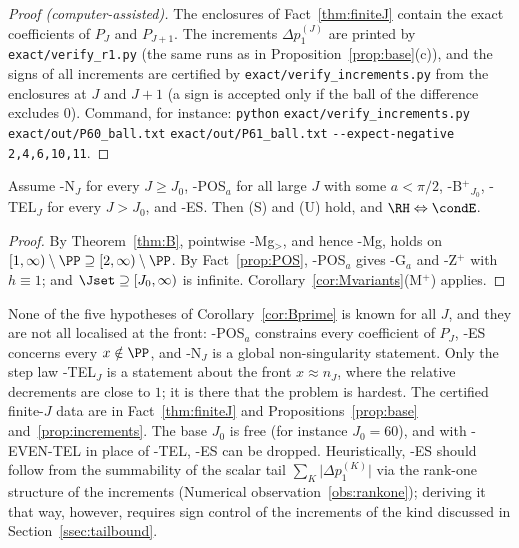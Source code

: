 \begin{proof}[Proof \textup{(computer-assisted)}]
The enclosures of Fact~\ref{thm:finiteJ} contain the exact coefficients of $P_J$ and $P_{J+1}$. The increments
$\Delta p_1^{(J)}$ are printed by \nolinkurl{exact/verify_r1.py} (the same runs as in Proposition~\ref{prop:base}(c)), and the
signs of all increments are certified by \nolinkurl{exact/verify_increments.py} from the enclosures at $J$ and $J+1$ (a sign
is accepted only if the ball of the difference excludes $0$). Command, for instance:
\texttt{python} \nolinkurl{exact/verify_increments.py} \nolinkurl{exact/out/P60_ball.txt} \nolinkurl{exact/out/P61_ball.txt}
\nolinkurl{--expect-negative} \nolinkurl{2,4,6,10,11}.
\end{proof}

\begin{corollary}\label{cor:Bprime}
Assume \hyp{N}$_J$ for every $J\ge J_0$, \hyp{POS$_a$} for all large $J$ with some $a<\pi/2$, \hyp{B$^+$}$_{J_0}$, \hyp{TEL$_J$}
for every $J>J_0$, and \hyp{ES}. Then (S) and (U) hold, and $\RH\Leftrightarrow\condE$.
\end{corollary}

\begin{proof}
By Theorem~\ref{thm:B}, pointwise \hyp{Mg$_>$}, and hence \hyp{Mg}, holds on $[1,\infty)\setminus\PP\supseteq[2,\infty)\setminus\PP$. By
Fact~\ref{prop:POS}, \hyp{POS$_a$} gives \hyp{G$_a$} and \hyp{Z$^+$} with $h\equiv1$; and $\Jset\supseteq[J_0,\infty)$ is
infinite. Corollary~\ref{cor:Mvariants}(M$^+$) applies.
\end{proof}

None of the five hypotheses of Corollary~\ref{cor:Bprime} is known for all $J$, and they are not all localised at the
front: \hyp{POS$_a$} constrains every coefficient of $P_J$, \hyp{ES} concerns every $x\notin\PP$, and \hyp{N}$_J$ is a global
non-singularity statement. Only the step law \hyp{TEL$_J$} is a statement about the front $x\approx n_J$, where the relative
decrements are close to $1$; it is there that the problem is hardest. The certified finite-$J$ data are in
Fact~\ref{thm:finiteJ} and Propositions~\ref{prop:base} and~\ref{prop:increments}. The base $J_0$ is free (for instance $J_0=60$), and with
\hyp{EVEN-TEL} in place of \hyp{TEL}, \hyp{ES} can be dropped. Heuristically, \hyp{ES} should follow from the
summability of the scalar tail $\sum_K\lvert\Delta p_1^{(K)}\rvert$ via the rank-one structure of the increments
(Numerical observation~\ref{obs:rankone}); deriving it that way, however, requires sign control of the increments of
the kind discussed in Section~\ref{ssec:tailbound}.

